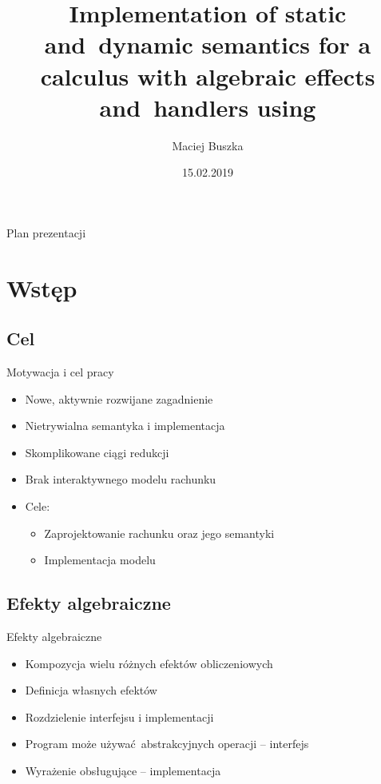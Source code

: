 \documentclass{beamer}
\title[A calculus with algebraic effects and~handlers]{Implementation of static and~dynamic semantics for a calculus with algebraic effects and~handlers using \Redex}
\author{Maciej Buszka}
\institute{Instytut Informatyki UWr}
\date{15.02.2019}
\begin{document}
\begin{frame}
  \titlepage
\end{frame}


\begin{frame}{Plan prezentacji}
  \tableofcontents
\end{frame}

\section{Wstęp}
\subsection{Cel}
\begin{frame}{Motywacja i cel pracy}
  \begin{itemize}
    \item Nowe, aktywnie rozwijane zagadnienie
    \pause
    \item Nietrywialna semantyka i implementacja
    \pause
    \item Skomplikowane ciągi redukcji
    \pause
    \item Brak interaktywnego modelu rachunku
    \pause
    \item Cele:
    \begin{itemize}
      \pause
      \item Zaprojektowanie rachunku oraz jego semantyki
      \pause
      \item Implementacja modelu
    \end{itemize}
  \end{itemize}
\end{frame}

\subsection{Efekty algebraiczne}
\begin{frame}{Efekty algebraiczne}
  \begin{itemize}
    \item Kompozycja wielu różnych efektów obliczeniowych
    \pause
    \item Definicja własnych efektów
    \pause
    \item Rozdzielenie interfejsu i implementacji
    \pause
    \item Program może używać abstrakcyjnych operacji -- interfejs
    \pause
    \item Wyrażenie obsługujące -- implementacja
  \end{itemize}
\end{frame}
\end{document}
